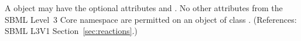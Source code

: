 A \ListOfModifierSpeciesReferences object may have the optional attributes
  and .  No other attributes from the SBML
Level~3 Core namespace are permitted on an object of class
\ListOfModifierSpeciesReferences.  (References: SBML L3V1
Section~\ref{sec:reactions}.)
